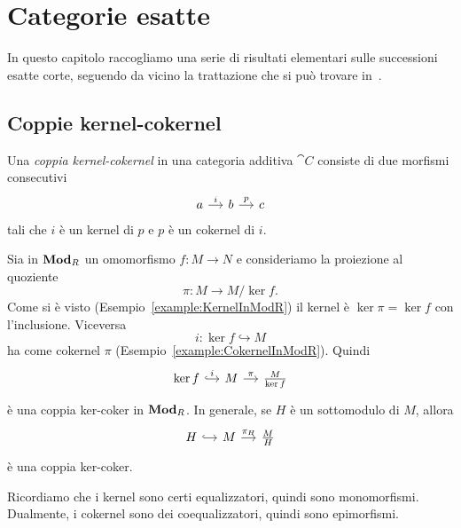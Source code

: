 
\chapter{Categorie esatte}

In questo capitolo raccogliamo una serie di risultati elementari sulle
successioni esatte corte, seguendo da vicino la trattazione che si può
trovare in~\cite{buehler:exactcategories}.



\section{Coppie kernel-cokernel}

\begin{definition}\label{definition:KerCoker}
  Una \emph{coppia kernel-cokernel} in una categoria additiva
  \(\cat C\) consiste di due morfismi consecutivi
  \[
    \begin{tikzcd}[column sep=small]
      a \ar["i", r] & b \ar["p", r] & c
    \end{tikzcd}
  \]
  tali che \(i\) è un kernel di \(p\) e \(p\) è un cokernel di \(i\).
\end{definition}

\begin{example}
  Sia in \(\mathbf{Mod}_R\) un omomorfismo \(f : M \to N\) e consideriamo la
  proiezione al quoziente
  \[
    \pi : M \to M/\ker f .
  \]
  Come si è visto (Esempio~\ref{example:KernelInModR}) il kernel è
  \(\ker \pi = \ker f\) con l'inclusione. Viceversa
  \[
    i : \ker f \hookrightarrow M
  \]
  ha come cokernel \(\pi\)
  (Esempio~\ref{example:CokernelInModR}). Quindi
  \[
    \begin{tikzcd}[column sep=small]
      \ker f \ar["i", hookrightarrow, r] & M \ar["\pi", r] &
      \frac{M}{\ker f}
    \end{tikzcd}
  \]
  è una coppia ker-coker in \(\mathbf{Mod}_R\). In generale, se \(H\) è un
  sottomodulo di \(M\), allora
  \[
    \begin{tikzcd}[column sep=small]
      H \ar[hookrightarrow, r] & M \ar["{\pi_H}", r] & \frac{M}{H}
    \end{tikzcd}
  \]
  è una coppia ker-coker.
\end{example}

\begin{remark}
  Ricordiamo che i kernel sono certi equalizzatori, quindi sono
  monomorfismi. Dualmente, i cokernel sono dei coequalizzatori, quindi
  sono epimorfismi.
\end{remark}

